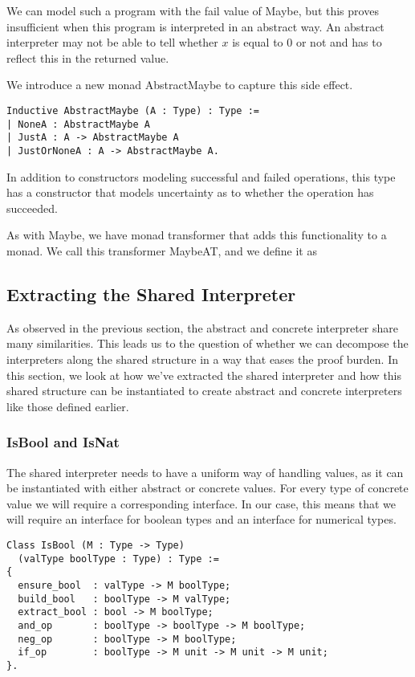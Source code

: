 We can model such a program with the fail value of Maybe, but this proves
insufficient when this program is interpreted in an abstract way. An abstract
interpreter may not be able to tell whether $x$ is equal to $0$ or not and has
to reflect this in the returned value.

We introduce a new monad AbstractMaybe to capture this side effect.

\begin{listing}[H]
\begin{verbatim}
Inductive AbstractMaybe (A : Type) : Type :=
| NoneA : AbstractMaybe A
| JustA : A -> AbstractMaybe A
| JustOrNoneA : A -> AbstractMaybe A.
\end{verbatim}
\end{listing}

In addition to constructors modeling successful and failed operations, this
type has a constructor that models uncertainty as to whether the operation has
succeeded.

As with Maybe, we have monad transformer that adds this functionality to a
monad. We call this transformer MaybeAT, and we define it as \\

\subsection{Extracting the Shared Interpreter}\label{sec:shared_interpreter}
As observed in the previous section, the abstract and concrete interpreter
share many similarities. This leads us to the question of whether we can
decompose the interpreters along the shared structure in a way that eases the
proof burden. In this section, we look at how we've extracted the shared
interpreter and how this shared structure can be instantiated to create
abstract and concrete interpreters like those defined earlier.

\subsubsection{IsBool and IsNat}
The shared interpreter needs to have a uniform way of handling values, as it
can be instantiated with either abstract or concrete values. For every type of
concrete value we will require a corresponding interface. In our case, this
means that we will require an interface for boolean types and an interface for
numerical types.

\begin{verbatim}
Class IsBool (M : Type -> Type)
  (valType boolType : Type) : Type :=
{
  ensure_bool  : valType -> M boolType;
  build_bool   : boolType -> M valType;
  extract_bool : bool -> M boolType;
  and_op       : boolType -> boolType -> M boolType;
  neg_op       : boolType -> M boolType;
  if_op        : boolType -> M unit -> M unit -> M unit;
}.
\end{verbatim}

